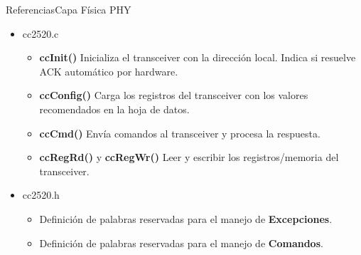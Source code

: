 \documentclass[aspectratio=169,handout]{beamer}
\begin{document}
\begin{frame}[t]{Referencias}{Capa Física PHY}
	\begin{itemize}
		\item cc2520.c
		\vspace{10px}
		\begin{itemize}
			\item \textbf{ccInit()} Inicializa el transceiver con la dirección local. Indica si resuelve ACK automático por hardware.
			\vspace{5px}
			\item \textbf{ccConfig()} Carga los registros del transceiver con los valores recomendados en la hoja de datos.
			\vspace{5px}
			\item \textbf{ccCmd()} Envía comandos al transceiver y procesa la respuesta.
			\vspace{5px}
			\item \textbf{ccRegRd()} y \textbf{ccRegWr()} Leer y escribir los registros/memoria del transceiver.
		\end{itemize}
		\vspace{10px}
		\item cc2520.h
		\vspace{10px}
		\begin{itemize}
			\item Definición de palabras reservadas para el manejo de \textbf{Excepciones}.  
			\vspace{5px}
			\item Definición de palabras reservadas para el manejo de \textbf{Comandos}.
		\end{itemize}	
	\end{itemize}

\end{frame}
\end{document}

